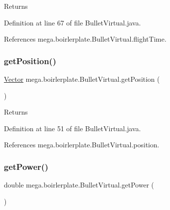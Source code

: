 \begin{DoxyReturn}{Returns}

\end{DoxyReturn}


Definition at line 67 of file Bullet\+Virtual.\+java.



References mega.\+boirlerplate.\+Bullet\+Virtual.\+flight\+Time.

\mbox{\label{classmega_1_1boirlerplate_1_1_bullet_virtual_a783ad83c584a2f888b84eee0a65d0351}} 
\subsubsection{\texorpdfstring{get\+Position()}{getPosition()}}
{\footnotesize\ttfamily \hyperlink{classmega_1_1boirlerplate_1_1_vector}{Vector} mega.\+boirlerplate.\+Bullet\+Virtual.\+get\+Position (\begin{DoxyParamCaption}{ }\end{DoxyParamCaption})}

\begin{DoxyReturn}{Returns}

\end{DoxyReturn}


Definition at line 51 of file Bullet\+Virtual.\+java.



References mega.\+boirlerplate.\+Bullet\+Virtual.\+position.

\mbox{\label{classmega_1_1boirlerplate_1_1_bullet_virtual_a933676dd4ece6ed22e47d75a8fc5cc67}} 
\subsubsection{\texorpdfstring{get\+Power()}{getPower()}}
{\footnotesize\ttfamily double mega.\+boirlerplate.\+Bullet\+Virtual.\+get\+Power (\begin{DoxyParamCaption}{ }\end{DoxyParamCaption})}

